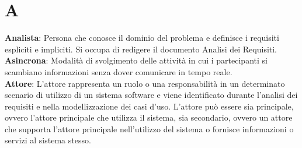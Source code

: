 \section{A}
\textbf{Analista}: Persona che conosce il dominio del problema e definisce i requisiti espliciti e impliciti. Si occupa di redigere il documento Analisi dei Requisiti.\\
\textbf{Asincrona}: Modalità di svolgimento delle attività in cui i partecipanti si scambiano informazioni senza dover comunicare in tempo reale.\\
\textbf{Attore}: L'attore rappresenta un ruolo o una responsabilità in un determinato scenario di utilizzo di un sistema software e viene identificato durante l'analisi dei requisiti e nella modellizzazione dei casi d'uso. L'attore può essere sia principale, ovvero l'attore principale che utilizza il sistema, sia secondario, ovvero un attore che supporta l'attore principale nell'utilizzo del sistema o fornisce informazioni o servizi al sistema stesso.\\
